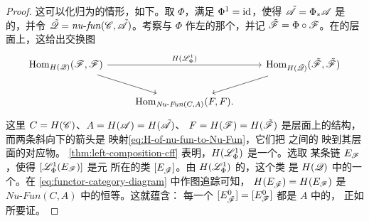 \begin{proof}
这可以化归为\trStrictlyUnital{}的情形，如下。取\trFormalDiffeomorphism{} $\Phi$，满足
$\Phi^1=\mathrm{id}$，使得 $\tilde{\mathscr{A}}=\Phi_{*}\mathscr{A}$ 是\trStrictlyUnital{}的，并令
$\tilde{\mathscr{Q}}=\mathit{nu}\text{-}\mathit{fun}(\mathscr{C},\tilde{\mathscr{A}})$。考察与
$\Phi$ 作左\trComposition{}的那个\trAFunctor，并记
$\tilde{\mathscr{F}}=\Phi\circ\mathscr{F}$。在\trNaturalTransformation{}的层面上，这给出交换图
\begin{equation}\label{eq:functor-category-diagram}
\begin{tikzcd}
\Hom_{H(\scr{Q})}(\scr{F},\scr{F})
  \ar[rr,"H(\scr{L}^1_{\Phi})"]
  \ar[dr]
&& \Hom_{H(\tilde{\scr{Q}})}(\tilde{\scr{F}},\tilde{\scr{F}})
  \ar[dl] \\
& \Hom_{\mathit{Nu}\text{-}\mathit{Fun}(C,A)}(F,F).
\end{tikzcd}
\end{equation}
这里 $C=H(\mathscr{C})$、$A=H(\mathscr{A})=H(\tilde{\mathscr{A}})$、
$F=H(\mathscr{F})=H(\tilde{\mathscr{F}})$ 是\trCohomology{}层面上的结构，而两条斜向下的箭头是
映射\eqref{eq:H-of-nu-fun-to-Nu-Fun}，它们把 \trAFunctor{}之间的%
\trNaturalTransformation{}映到其\trCohomology{}层面的对应物。
\cref{thm:left-composition-cff} 表明，$H(\mathscr{L}^1_{\Phi})$ 是一个\trIsomorphism。选取
某条链 $E_{\mathscr{F}}$，使得 $[\mathscr{L}^1_{\Phi}(E_{\mathscr{F}})]$ 是\trStrictlyUnital{}元
所在的类 $[E_{\tilde{\mathscr{F}}}]$。由 $H(\mathscr{L}^1_{\Phi})$ 的\trFunctoriality，这个类
是 $H(\mathscr{Q})$ 中的一个\trIdentityMorphism。在
\eqref{eq:functor-category-diagram} 中作图追踪可知，
$H(E_{\tilde{\mathscr{F}}})=H(E_{\mathscr{F}})$ 是
$\mathit{Nu}\text{-}\mathit{Fun}(C,A)$ 中的恒等\trNaturalTransformation。这就蕴含：
每一个 $[E^0_{\tilde{\mathscr{F}}}]=[E^0_{\mathscr{F}}]$ 都是 $A$ 中的\trIdentityMorphism，
正如所要证。
\end{proof}

